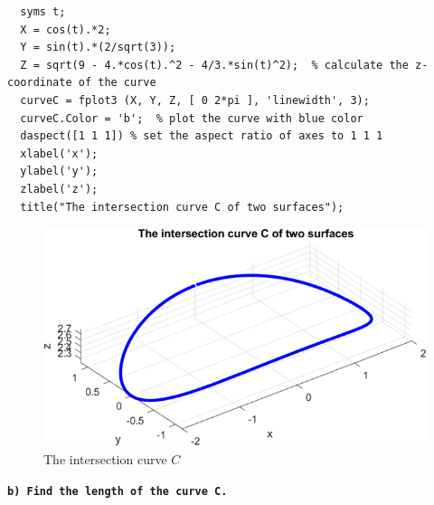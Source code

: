 \begin{lstlisting}[style=Matlab-editor]
  % Draw the curve C as the interection of 2 surfaces without line:
  syms t;
  X = cos(t).*2;
  Y = sin(t).*(2/sqrt(3));
  Z = sqrt(9 - 4.*cos(t).^2 - 4/3.*sin(t)^2);  % calculate the z-coordinate of the curve
  curveC = fplot3 (X, Y, Z, [ 0 2*pi ], 'linewidth', 3);
  curveC.Color = 'b';  % plot the curve with blue color
  daspect([1 1 1]) % set the aspect ratio of axes to 1 1 1
  xlabel('x');
  ylabel('y');
  zlabel('z');
  title("The intersection curve C of two surfaces"); 
\end{lstlisting}

\begin{figure}[H]
  \centering
  \includegraphics[width=12cm]{graphics/3a4.png}
  \caption{The intersection curve $C$}
\end{figure}

\textbf{ \texttt{b) Find the length of the curve C.} }\\


